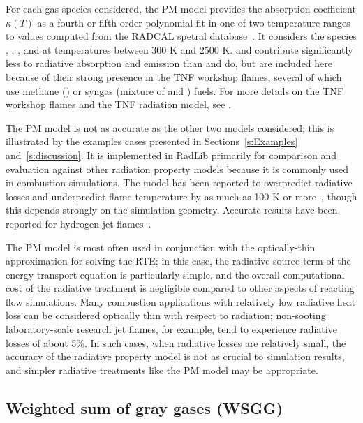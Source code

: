 \documentclass[preprint,12pt]{elsarticle}
\begin{document}
    For each gas species considered, the PM model provides the absorption coefficient $\kappa(T)$ as a fourth or fifth order
    polynomial fit in one of two temperature ranges to values computed from the RADCAL spetral database~\cite{Grosshandler_1993}.
    It considers the species , , , and  at temperatures between 300 K and 2500 K.
     and  contribute significantly less to radiative absorption and emission than  and
     do, but are included here because of their strong presence in the TNF workshop flames, several of which
    use methane () or syngas (mixture of  and ) fuels. For more details on the TNF workshop
    flames and the TNF radiation model, see \cite{TNF}.

    The PM model is not as accurate as the other two models considered; this is illustrated by the examples cases
    presented in Sections~\ref{s:Examples} and~\ref{s:discussion}.
    It is implemented in RadLib primarily for comparison and evaluation against other radiation property models
    because it is commonly used in combustion simulations.
    The model has been reported to overpredict radiative losses and underpredict flame temperature by as much as 100
    K or more~\cite{Frank_2000,Zhu_2002,Coelho_2002}, though this depends strongly on the simulation geometry. Accurate
    results have been reported for hydrogen jet flames~\cite{Barlow_1999}.

    The PM model is most often used in conjunction with the optically-thin approximation for solving the RTE; in this
    case, the radiative source term of the energy transport equation is particularly simple, and the overall
    computational cost of the radiative treatment is negligible compared to other aspects of reacting flow
    simulations. Many combustion applications with relatively low radiative heat loss can be considered optically
    thin with respect to radiation; non-sooting laboratory-scale research jet flames, for example, tend to experience
    radiative losses of about 5\%. In such cases, when radiative losses are relatively small, the accuracy of the
    radiative property model is not as crucial to simulation results, and simpler radiative treatments like the PM model
    may be appropriate.


    \subsection{Weighted sum of gray gases (WSGG)} \label{s:wsgg}
\end{document}
